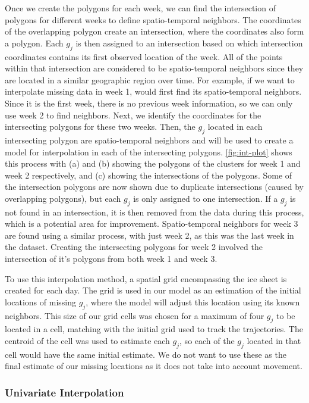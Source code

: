 \documentclass[12pt]{article}
\begin{document}
Once we create the polygons for each week, we can find the intersection
of polygons for different weeks to define spatio-temporal neighbors. The
coordinates of the overlapping polygon create an intersection, where the
coordinates also form a polygon. Each \(g_j\) is then assigned to an
intersection based on which intersection coordinates contains its first
observed location of the week. All of the points within that
intersection are considered to be spatio-temporal neighbors since they
are located in a similar geographic region over time. For example, if we
want to interpolate missing data in week 1, would first find its
spatio-temporal neighbors. Since it is the first week, there is no
previous week information, so we can only use week 2 to find neighbors.
Next, we identify the coordinates for the intersecting polygons for
these two weeks. Then, the \(g_j\) located in each intersecting polygon
are spatio-temporal neighbors and will be used to create a model for
interpolation in each of the intersecting polygons. \cref{fig:int-plot}
shows this process with (a) and (b) showing the polygons of the clusters
for week 1 and week 2 respectively, and (c) showing the intersections of
the polygons. Some of the intersection polygons are now shown due to
duplicate intersections (caused by overlapping polygons), but each
\(g_j\) is only assigned to one intersection. If a \(g_j\) is not found
in an intersection, it is then removed from the data during this
process, which is a potential area for improvement. Spatio-temporal
neighbors for week 3 are found using a similar process, with just week
2, as this was the last week in the dataset. Creating the intersecting
polygons for week 2 involved the intersection of it's polygons from both
week 1 and week 3.

To use this interpolation method, a spatial grid encompassing the ice
sheet is created for each day. The grid is used in our model as an
estimation of the initial locations of missing \(g_j\), where the model
will adjust this location using its known neighbors. This size of our
grid cells was chosen for a maximum of four \(g_j\) to be located in a
cell, matching with the initial grid used to track the trajectories. The
centroid of the cell was used to estimate each \(g_j\), so each of the
\(g_j\) located in that cell would have the same initial estimate. We do
not want to use these as the final estimate of our missing locations as
it does not take into account movement.

\hypertarget{univariate-interpolation}{%
\subsubsection{Univariate
Interpolation}\label{univariate-interpolation}}
\end{document}
